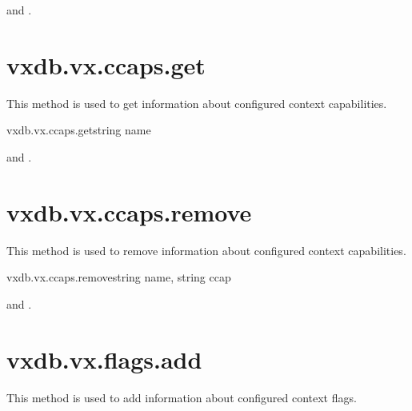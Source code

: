 \begin{rpcaccess}
 and \rpcownerchecks.
\end{rpcaccess}

\rpcreturnnil

\rpcnoerrors


\section{vxdb.vx.ccaps.get}

This method is used to get information about configured context capabilities.

\begin{rpcsynopsis}{vxdb.vx.ccaps.get}{string name}
\end{rpcsynopsis}

\begin{rpcaccess}
 and \rpcownerchecks.
\end{rpcaccess}


\rpcnoerrors


\section{vxdb.vx.ccaps.remove}

This method is used to remove information about configured context
capabilities.

\begin{rpcsynopsis}{vxdb.vx.ccaps.remove}{string name, string ccap}
\end{rpcsynopsis}

\begin{rpcaccess}
 and \rpcownerchecks.
\end{rpcaccess}

\rpcreturnnil

\rpcnoerrors


\section{vxdb.vx.flags.add}

This method is used to add information about configured context flags.

